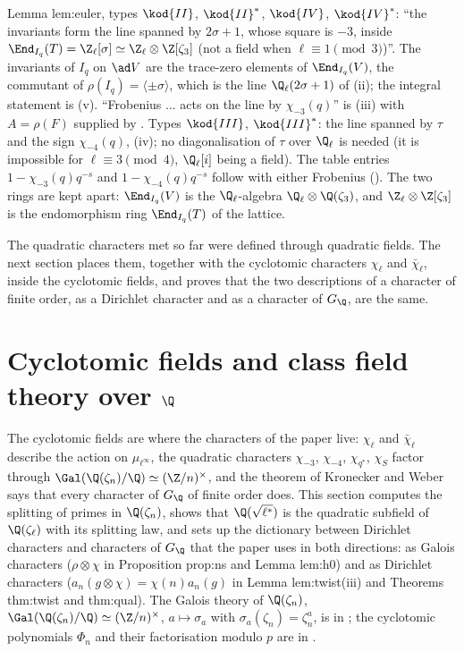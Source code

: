 \begin{paperlink}\label{pl:ant:euler}
Lemma lem:euler, types $\kod{II}$, $\kod{II}^*$, $\kod{IV}$, $\kod{IV}^*$: ``the invariants form the line spanned by $2\sigma+1$, whose square is $-3$, inside
$\End_{I_q}(T)=\Z_\ell[\sigma]\simeq\Z_\ell\otimes\Z[\zeta_3]$ (not a field when $\ell\equiv1\pmod3$)''. The invariants of $I_q$ on $\ad V$ are the trace-zero
elements of $\End_{I_q}(V)$, the commutant of $\rho(I_q)=\langle\pm\sigma\rangle$, which is the line $\Q_\ell(2\sigma+1)$ of (ii); the
integral statement is (v). ``Frobenius ... acts on the line by $\chi_{-3}(q)$'' is (iii) with $A=\rho(F)$
supplied by . Types $\kod{III}$, $\kod{III}^*$: the line spanned by $\tau$ and the sign $\chi_{-4}(q)$, (iv); no
diagonalisation of $\tau$ over $\Q_\ell$ is needed (it is impossible for $\ell\equiv3\pmod4$, $\Q_\ell[i]$ being a field). The table entries
$1-\chi_{-3}(q)q^{-s}$ and $1-\chi_{-4}(q)q^{-s}$ follow with either Frobenius (). The two rings are kept apart: $\End_{I_q}(V)$ is the $\Q_\ell$-algebra
$\Q_\ell\otimes\Q(\zeta_3)$, and $\Z_\ell\otimes\Z[\zeta_3]$ is the endomorphism ring $\End_{I_q}(T)$ of the lattice.
\end{paperlink}

The quadratic characters met so far were defined through quadratic fields. The next section places them, together with the cyclotomic characters
$\chi_\ell$ and $\bar\chi_\ell$, inside the cyclotomic fields, and proves that the two descriptions of a character of finite order, as a Dirichlet character and as a
character of $G_\Q$, are the same.

\section{Cyclotomic fields and class field theory over \texorpdfstring{$\Q$}{Q}}\label{sec:ant:cyclotomic}

The cyclotomic fields are where the characters of the paper live: $\chi_\ell$ and $\bar\chi_\ell$ describe the action on $\mu_{\ell^\infty}$, the quadratic
characters $\chi_{-3}$, $\chi_{-4}$, $\chi_{q^*}$, $\chi_S$ factor through $\Gal(\Q(\zeta_n)/\Q)\simeq(\Z/n)^\times$, and the theorem of Kronecker and Weber
says that every character of $G_\Q$ of finite order does. This section computes the splitting of primes in $\Q(\zeta_n)$, shows that
$\Q(\sqrt{\ell^*})$ is the quadratic subfield of $\Q(\zeta_\ell)$ with its splitting law, and sets up the dictionary between Dirichlet characters and
characters of $G_\Q$ that the paper uses in both directions: as Galois characters ($\rho\otimes\chi$ in Proposition prop:ns and Lemma lem:h0) and as
Dirichlet characters ($a_n(g\otimes\chi)=\chi(n)a_n(g)$ in Lemma lem:twist(iii) and Theorems thm:twist and thm:qual). The Galois theory of $\Q(\zeta_n)$,
$\Gal(\Q(\zeta_n)/\Q)\simeq(\Z/n)^\times$, $a\mapsto\sigma_a$ with $\sigma_a(\zeta_n)=\zeta_n^a$, is in ; the cyclotomic polynomials $\Phi_n$ and
their factorisation modulo $p$ are in .

